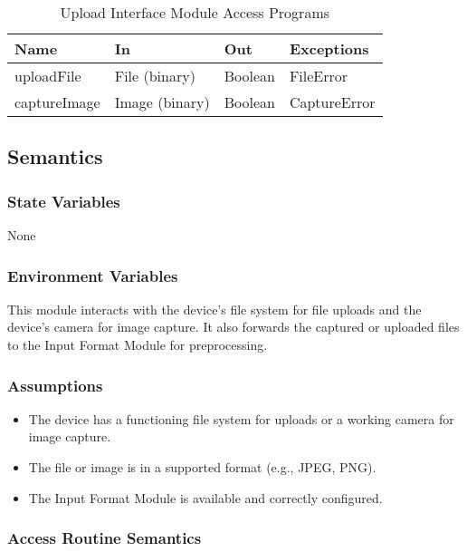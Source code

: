 \documentclass[12pt, titlepage]{article}
\begin{document}
\begin{center}
\begin{table}[H]
  \caption{Upload Interface Module Access Programs}
\begin{tabular}{p{4cm} p{4cm} p{4cm} p{4cm}}
\hline
\textbf{Name} & \textbf{In} & \textbf{Out} & \textbf{Exceptions} \\
\hline
uploadFile & File (binary) & Boolean & FileError \\
captureImage & Image (binary) & Boolean & CaptureError \\
\hline
\end{tabular}
\end{table}
\end{center}

\subsection{Semantics}

\subsubsection{State Variables}

None

\subsubsection{Environment Variables}

This module interacts with the device's file system for file uploads and the
device's camera for image capture. It also forwards the captured or uploaded
files to the Input Format Module for preprocessing.

\subsubsection{Assumptions}

\begin{itemize}
    \item The device has a functioning file system for uploads or a working camera for image capture.
    \item The file or image is in a supported format (e.g., JPEG, PNG).
    \item The Input Format Module is available and correctly configured.
\end{itemize}

\subsubsection{Access Routine Semantics}
\end{document}
